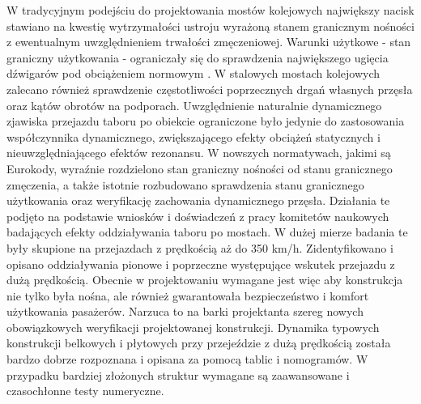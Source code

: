 W tradycyjnym podejściu do projektowania mostów kolejowych największy nacisk stawiano na kwestię wytrzymałości ustroju wyrażoną stanem granicznym nośności z ewentualnym uwzględnieniem trwałości zmęczeniowej. Warunki użytkowe - stan graniczny użytkowania - ograniczały się do sprawdzenia największego ugięcia dźwigarów pod obciążeniem normowym \parencite{PKNf}. W stalowych mostach kolejowych zalecano również sprawdzenie częstotliwości poprzecznych drgań własnych przęsła oraz kątów obrotów na podporach. Uwzględnienie naturalnie dynamicznego zjawiska przejazdu taboru po obiekcie ograniczone było jedynie do zastosowania współczynnika dynamicznego, zwiększającego efekty obciążeń statycznych i nieuwzględniającego efektów rezonansu. 
W nowszych normatywach, jakimi są Eurokody, wyraźnie rozdzielono stan graniczny nośności od stanu granicznego zmęczenia, a także istotnie rozbudowano sprawdzenia stanu granicznego użytkowania oraz weryfikację zachowania dynamicznego przęsła. Działania te podjęto na podstawie wniosków i doświadczeń z pracy komitetów naukowych badających efekty oddziaływania taboru po mostach. W dużej mierze badania te były skupione na przejazdach z prędkością aż do 350 km/h. Zidentyfikowano i opisano oddziaływania pionowe i poprzeczne występujące wskutek przejazdu z dużą prędkością. Obecnie w projektowaniu wymagane jest więc aby konstrukcja nie tylko była nośna, ale również gwarantowała bezpieczeństwo i komfort użytkowania pasażerów. Narzuca to na barki projektanta szereg nowych obowiązkowych weryfikacji projektowanej konstrukcji. Dynamika typowych konstrukcji belkowych i płytowych przy przejeździe z dużą prędkością została bardzo dobrze rozpoznana i opisana za pomocą tablic i nomogramów. W przypadku bardziej złożonych struktur wymagane są zaawansowane i czasochłonne testy numeryczne. 

